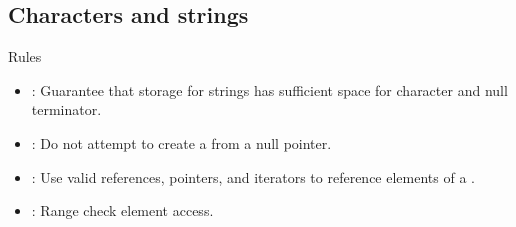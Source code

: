 \subsection{Characters and strings}

\begin{frame}[t]{Rules}
\begin{itemize}
  \item {}: 
        Guarantee that storage for strings has sufficient space for character and null terminator.
  \vfill
  \item {}: 
        Do not attempt to create a  from a null pointer.
  \vfill
  \item {}: 
        Use valid references, pointers, and iterators to reference elements of a .
  \vfill
  \item {}: 
        Range check element access.
\end{itemize}
\end{frame}
